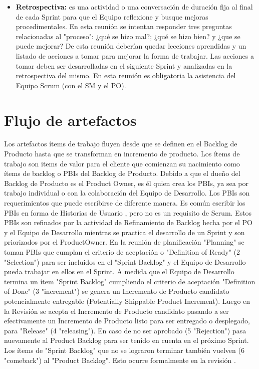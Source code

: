 \begin{itemize}
\item \textbf{Retrospectiva:} es una actividad o una conversación de duración fija al final de cada Sprint para que el Equipo reflexione y busque mejoras procedimentales. En esta reunión se intentan responder tres preguntas relacionadas al "proceso": ¿qué se hizo mal?; ¿qué se hizo bien? y ¿que se puede mejorar?
De esta reunión deberían quedar lecciones aprendidas y un listado de acciones a tomar para mejorar la forma de trabajar. Las acciones a tomar deben ser desarrolladas en el siguiente Sprint y analizadas en la retrospectiva del mismo.
En esta reunión es obligatoria la asistencia del Equipo Scrum (con el SM y el PO).

\end{itemize}

\section{Flujo de artefactos}

Los artefactos ítems de trabajo fluyen desde que se definen en el Backlog de Producto hasta que se transforman en incremento de producto. Los ítems de trabajo son items de valor para el cliente que comienzan su nacimiento como ítems de backlog o PBIs del Backlog de Producto. Debido a que el dueño del Backlog de Producto es el Product Owner, es él quien crea los PBIs, ya sea por trabajo individual o con la colaboración del Equipo de Desarrollo. Los PBIs son requerimientos que puede escribirse de diferente manera. Es común escribir los PBIs en forma de Historias de Usuario \cite{Cohn-2004}, pero no es un requisito de Scrum. Estos PBIs son refinados por la actividad de Refinamiento de Backlog hecha por el PO y el Equipo de Desarrollo mientras se practica el desarrollo de un Sprint y son priorizados por el ProductOwner. En la reunión de planificación "Planning" se toman PBIs que cumplan el criterio de aceptación o "Definition of Ready" (2 "Selection") para ser incluidos en el "Sprint Backlog" y el Equipo de Desarrollo pueda trabajar en ellos en el Sprint. A medida que el Equipo de Desarrollo termina un ítem "Sprint Backlog" cumpliendo el criterio de aceptación "Definition of Done" (3 "increment") se genera un Incremento de Producto candidato potencialmente entregable (Potentially Shippable Product Increment). Luego en la Revisión se acepta el Incremento de Producto candidato pasando a ser efectivamente un Incremento de Producto listo para ser entregado o desplegado, para "Release" (4 "releasing"). En caso de no ser aprobado (5 "Rejection") pasa nuevamente al Product Backlog para ser tenido en cuenta en el próximo Sprint. Los ítems de "Sprint Backlog" que no se lograron terminar también vuelven (6 "comeback") al "Product Backlog". Esto ocurre formalmente en la revisión \cite{Martin-Alaimo-2014}.

